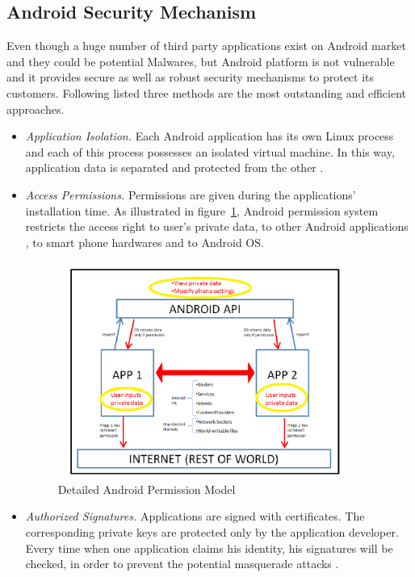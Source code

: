 \subsection{Android Security Mechanism}
Even though a huge number of third party applications exist on Android market and they could be potential Malwares, but Android platform is not vulnerable and it provides secure as well as robust security mechanisms to protect its customers. Following listed three methods are the most outstanding and efficient approaches.
\begin{itemize}
\item \emph{Application Isolation.} Each Android application has its own Linux process and each of this process possesses an isolated virtual machine. In this way, application data is separated and protected from the other \cite{android_secure_language}. 
\item \emph{Access Permissions.} Permissions are given during the applications' installation time. As illustrated in figure~\ref{fig:android-permission}, Android permission system restricts the access right to user's private data, to other Android applications , to smart phone hardwares and to Android OS. 
\begin{figure}[!htb]
	\centering
	\includegraphics[width=0.9\textwidth]{android-permission.jpg}
		\caption{Detailed Android Permission Model \cite{android_secure_design}}
	\label{fig:android-permission}
\end{figure}
\item \emph{Authorized Signatures.} Applications are signed with certificates. The corresponding private keys are protected only by the application developer. Every time when one application claims his identity, his signatures will be checked, in order to prevent the potential masquerade attacks \cite{android_secure_language}.
\end{itemize}

